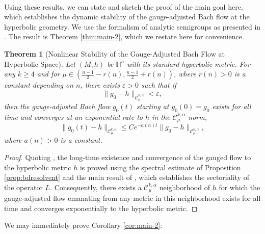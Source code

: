 \documentclass[10pt,reqno]{amsart}
\newtheorem{theorem}{Theorem}[section]
\newcommand{\vep}{\varepsilon}
\begin{document}
\

Using these results, we can state and sketch the proof of the main goal here, which establishes the dynamic stability of the gauge-adjusted Bach flow at the hyperbolic geometry. We use the formalism of analytic semigroups as presented in
\cite{Lunardi}.  The result is Theorem \ref{thm:main-2}, which we restate here for convenience.

\begin{theorem}[Nonlinear Stability of the Gauge-Adjusted Bach Flow at Hyperbolic Space]  Let $(M,h)$ be $\mathbb H^n$ with its standard hyperbolic metric. For any $k\geq 4$ and for
$\mu \in (\frac{n-1}{2} - r(n), \frac{n-1}{2}+r(n))$, where $r(n) > 0$ is a  constant depending on $n$, there exists $\vep > 0$ such that if  
\begin{equation*}
\| 
g_0 - h 
\|_{\mathcal C^{k,\alpha}_{\mu}} < \vep,
\end{equation*}
then the gauge-adjusted Bach flow $g_0(t)$ starting at $g_0(0) = g_0$ exists for all time and converges at an exponential rate to $h$ in the $\mathcal C^{k,\alpha}_{\mu}$ norm,
\begin{equation*}
\| g_0 (t) - h \|_{\mathcal C^{k,\alpha}_{\mu}} \leq C e^{-a(n) t}  \| g_0 - h \|_{\mathcal C^{k,\alpha}_{\mu}},
\end{equation*}
where $a(n)>0$ is a constant.
\end{theorem}


\begin{proof}
Quoting \cite[Proposition 9.1.2]{Lunardi}, the long-time existence and convergence of the gauged flow to the hyperbolic metric $h$ is proved using the spectral estimate 
of Proposition \ref{prop:bdresolvent} and the main result of \cite{BGIM2}, which establishes the sectoriality of the operator $L$.  Consequently, there exists 
a $\mathcal C^{k,\alpha}_\mu$ neighborhood of $h$ for which the gauge-adjusted flow emanating from any metric in this neighborhood exists for all time and 
converges exponentially to the hyperbolic metric. 

\end{proof}

We may immediately prove Corollary \ref{cor:main-2}:
\end{document}
